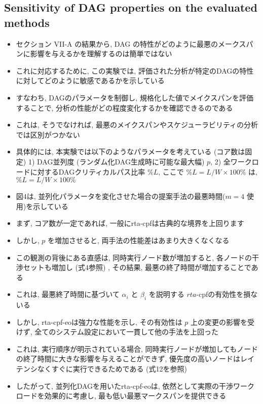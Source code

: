 \subsection{Sensitivity of DAG properties on the evaluated methods}
\label{ssec: Sensitivity of DAG properties on the evaluated methods}

\begin{frame}{}
    \begin{itemize}
        \item セクション VII-A の結果から, DAG の特性がどのように最悪のメークスパンに影響を与えるかを理解するのは簡単ではない
\item これに対応するために, この実験では, 評価された分析が特定のDAGの特性に対してどのように敏感であるかを示している
\item すなわち, DAGのパラメータを制御し, 規格化した値でメイクスパンを評価することで, 分析の性能がどの程度変化するかを確認できるのである
\item これは, そうでなければ, 最悪のメイクスパンやスケジューラビリティの分析では区別がつかない
\item 具体的には, 本実験では以下のようなパラメータを考えている (コア数は固定) 1) DAG並列度 (ランダム化DAG生成時に可能な最大幅)  $p$, 2) 全ワークロードに対するDAGクリティカルパス比率 $\% L$, ここで $\% L=L / W \times 100 \%$ は, $\% L=L / W \times 100 \%$
    \end{itemize}
\end{frame}

\begin{frame}{}
    \begin{itemize}
        \item 図4は, 並列化パラメータを変化させた場合の提案手法の最悪時間($m=4$ 使用)を示している
\item まず, コア数が一定であれば, 一般にrta-cpfは古典的な境界を上回ります
\item しかし, $p$ を増加させると, 両手法の性能差はあまり大きくなくなる
\item この観測の背後にある直感は, 同時実行ノード数が増加すると, 各ノードの干渉セットも増加し (式4参照) , その結果, 最悪の終了時間が増加することである
\item これは, 最悪終了時間に基づいて $\alpha_{i}$ と $\beta_{i}$ を説明する $r t a$-cpfの有効性を損ないる
    \end{itemize}
\end{frame}

\begin{frame}{}
    \begin{itemize}
        \item しかし, rta-cpf-eoは強力な性能を示し, その有効性は $p$ 上の変更の影響を受けず, 全てのシステム設定において一貫して他の手法を上回った
\item これは, 実行順序が明示されている場合, 同時実行ノードが増加してもノードの終了時間に大きな影響を与えることができず, 優先度の高いノードはレイテンシなくすぐに実行できるためである (式12を参照) 
\item したがって, 並列化DAGを用いたrta-cpf-eoは, 依然として実際の干渉ワークロードを効果的に考慮し, 最も低い最悪マークスパンを提供できる
    \end{itemize}
\end{frame}

